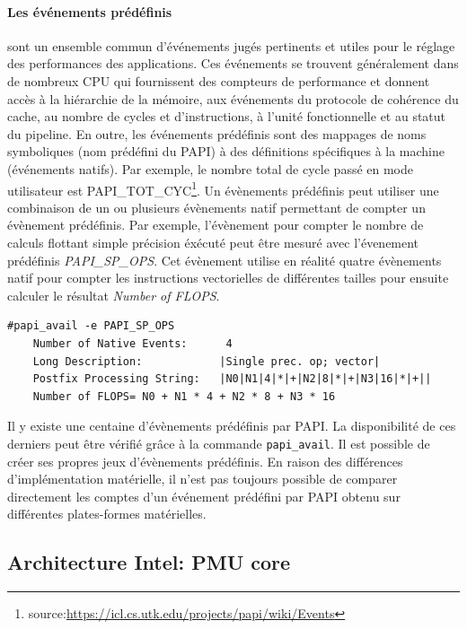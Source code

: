     \paragraph{Les événements \textbf{prédéfinis}} sont un ensemble commun d'événements jugés pertinents et utiles pour le réglage des performances des applications. Ces événements se trouvent généralement dans de nombreux CPU qui fournissent des compteurs de performance et donnent accès à la hiérarchie de la mémoire, aux événements du protocole de cohérence du cache, au nombre de cycles et d'instructions, à l'unité fonctionnelle et au statut du pipeline. En outre, les événements prédéfinis sont des mappages de noms symboliques (nom prédéfini du PAPI) à des définitions spécifiques à la machine (événements natifs). Par exemple, le nombre total de cycle passé en mode utilisateur est PAPI\_TOT\_CYC\footnote{source:\url{https://icl.cs.utk.edu/projects/papi/wiki/Events}}. Un évènements prédéfinis peut utiliser une combinaison de un ou plusieurs évènements natif permettant de compter un évènement prédéfinis. Par exemple, l'évènement pour compter le nombre de calculs flottant simple précision éxécuté peut être mesuré avec l'évenement prédéfinis \textit{PAPI\_SP\_OPS}. Cet évènement utilise en réalité quatre évènements natif pour compter les instructions vectorielles de différentes tailles pour ensuite calculer le résultat \textit{Number of FLOPS}.

\begin{verbatim}
#papi_avail -e PAPI_SP_OPS
    Number of Native Events:      4
    Long Description:            |Single prec. op; vector|
    Postfix Processing String:   |N0|N1|4|*|+|N2|8|*|+|N3|16|*|+||
    Number of FLOPS= N0 + N1 * 4 + N2 * 8 + N3 * 16
\end{verbatim}

    Il y existe une centaine d'évènements prédéfinis par PAPI. La disponibilité de ces derniers peut être vérifié grâce à la commande \verb|papi_avail|. Il est possible de créer ses propres jeux d'évènements prédéfinis. En raison des différences d'implémentation matérielle, il n'est pas toujours possible de comparer directement les comptes d'un événement prédéfini par PAPI obtenu sur différentes plates-formes matérielles.


\subsection{Architecture Intel: PMU core}
    
